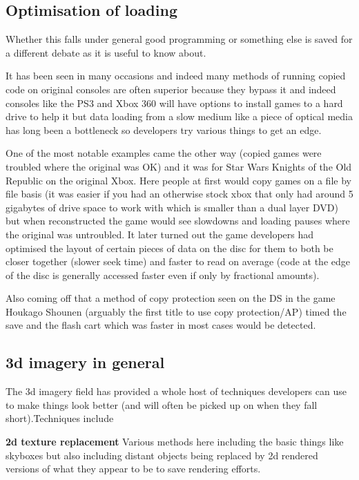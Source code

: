 \documentclass[
]{book}
\begin{document}
\hypertarget{optimisation-of-loading}{%
\subsection{Optimisation of loading}\label{optimisation-of-loading}}

Whether this falls under general good programming or something else is saved for a different debate as it is useful to know about.

It has been seen in many occasions and indeed many methods of running copied code on original consoles are often superior because they bypass it and indeed consoles like the PS3 and Xbox 360 will have options to install games to a hard drive to help it but data loading from a slow medium like a piece of optical media has long been a bottleneck so developers try various things to get an edge.

One of the most notable examples came the other way (copied games were troubled where the original was OK) and it was for Star Wars Knights of the Old Republic on the original Xbox. Here people at first would copy games on a file by file basis (it was easier if you had an otherwise stock xbox that only had around 5 gigabytes of drive space to work with which is smaller than a dual layer DVD) but when reconstructed the game would see slowdowns and loading pauses where the original was untroubled. It later turned out the game developers had optimised the layout of certain pieces of data on the disc for them to both be closer together (slower seek time) and faster to read on average (code at the edge of the disc is generally accessed faster even if only by fractional amounts).

Also coming off that a method of copy protection seen on the DS in the game Houkago Shounen (arguably the first title to use copy protection/AP) timed the save and the flash cart which was faster in most cases would be detected.

\hypertarget{d-imagery-in-general}{%
\subsection{3d imagery in general}\label{d-imagery-in-general}}

The 3d imagery field has provided a whole host of techniques developers can use to make things look better (and will often be picked up on when they fall short).Techniques include

\textbf{2d texture replacement} Various methods here including the basic things like skyboxes but also including distant objects being replaced by 2d rendered versions of what they appear to be to save rendering efforts.
\end{document}

